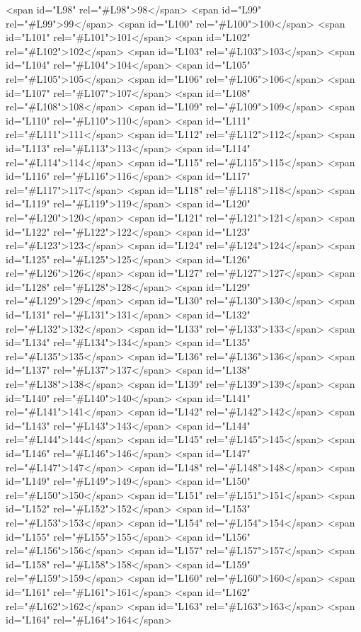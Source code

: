 <span id="L98" rel="#L98">98</span>
<span id="L99" rel="#L99">99</span>
<span id="L100" rel="#L100">100</span>
<span id="L101" rel="#L101">101</span>
<span id="L102" rel="#L102">102</span>
<span id="L103" rel="#L103">103</span>
<span id="L104" rel="#L104">104</span>
<span id="L105" rel="#L105">105</span>
<span id="L106" rel="#L106">106</span>
<span id="L107" rel="#L107">107</span>
<span id="L108" rel="#L108">108</span>
<span id="L109" rel="#L109">109</span>
<span id="L110" rel="#L110">110</span>
<span id="L111" rel="#L111">111</span>
<span id="L112" rel="#L112">112</span>
<span id="L113" rel="#L113">113</span>
<span id="L114" rel="#L114">114</span>
<span id="L115" rel="#L115">115</span>
<span id="L116" rel="#L116">116</span>
<span id="L117" rel="#L117">117</span>
<span id="L118" rel="#L118">118</span>
<span id="L119" rel="#L119">119</span>
<span id="L120" rel="#L120">120</span>
<span id="L121" rel="#L121">121</span>
<span id="L122" rel="#L122">122</span>
<span id="L123" rel="#L123">123</span>
<span id="L124" rel="#L124">124</span>
<span id="L125" rel="#L125">125</span>
<span id="L126" rel="#L126">126</span>
<span id="L127" rel="#L127">127</span>
<span id="L128" rel="#L128">128</span>
<span id="L129" rel="#L129">129</span>
<span id="L130" rel="#L130">130</span>
<span id="L131" rel="#L131">131</span>
<span id="L132" rel="#L132">132</span>
<span id="L133" rel="#L133">133</span>
<span id="L134" rel="#L134">134</span>
<span id="L135" rel="#L135">135</span>
<span id="L136" rel="#L136">136</span>
<span id="L137" rel="#L137">137</span>
<span id="L138" rel="#L138">138</span>
<span id="L139" rel="#L139">139</span>
<span id="L140" rel="#L140">140</span>
<span id="L141" rel="#L141">141</span>
<span id="L142" rel="#L142">142</span>
<span id="L143" rel="#L143">143</span>
<span id="L144" rel="#L144">144</span>
<span id="L145" rel="#L145">145</span>
<span id="L146" rel="#L146">146</span>
<span id="L147" rel="#L147">147</span>
<span id="L148" rel="#L148">148</span>
<span id="L149" rel="#L149">149</span>
<span id="L150" rel="#L150">150</span>
<span id="L151" rel="#L151">151</span>
<span id="L152" rel="#L152">152</span>
<span id="L153" rel="#L153">153</span>
<span id="L154" rel="#L154">154</span>
<span id="L155" rel="#L155">155</span>
<span id="L156" rel="#L156">156</span>
<span id="L157" rel="#L157">157</span>
<span id="L158" rel="#L158">158</span>
<span id="L159" rel="#L159">159</span>
<span id="L160" rel="#L160">160</span>
<span id="L161" rel="#L161">161</span>
<span id="L162" rel="#L162">162</span>
<span id="L163" rel="#L163">163</span>
<span id="L164" rel="#L164">164</span>
